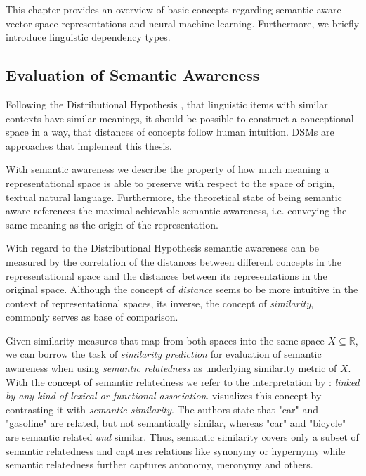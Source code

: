 This chapter provides an overview of basic concepts regarding semantic aware vector space representations and neural machine learning. Furthermore, we briefly introduce linguistic dependency types.

\subsection{Evaluation of Semantic Awareness} \label{subsec:eval_semantic_awareness}
Following the Distributional Hypothesis \autocite{harris_distributional_1954}, that linguistic items with similar contexts have similar meanings, it should be possible to construct a conceptional space in a way, that distances of concepts follow human intuition.
\acfp{DSM} \autocite{landauer_solution_1997,schutze_automatic_1998} are approaches that implement this thesis.

With semantic awareness we describe the property of how much meaning a representational space is able to preserve with respect to the space of origin, textual natural language. Furthermore, the theoretical state of being semantic aware references the maximal achievable semantic awareness, i.e. conveying the same meaning as the origin of the representation.

With regard to the Distributional Hypothesis semantic awareness can be measured by the correlation of the distances between different concepts in the representational space and the distances between its representations in the original space. Although the concept of \textit{distance} seems to be more intuitive in the context of representational spaces, its inverse, the concept of \textit{similarity}, commonly serves as base of comparison.  

Given similarity measures that map from both spaces into the same space $X \subseteq \mathbb{R}$, we can borrow the task of \textit{similarity prediction} for evaluation of semantic awareness when using \textit{semantic relatedness} as underlying similarity metric of $X$. With the concept of semantic relatedness we refer to the interpretation by \textcite{budanitsky_evaluating_2006}: \textit{linked by any kind of lexical or functional association}. \textcite{resnik_semantic_1999} visualizes this concept by contrasting it with \textit{semantic similarity}. The authors state that "car" and "gasoline" are related, but not semantically similar, whereas "car" and "bicycle" are semantic related \textit{and} similar. Thus, semantic similarity covers only a subset of semantic relatedness and captures relations like synonymy or hypernymy while semantic relatedness further captures antonomy, meronymy and others.

